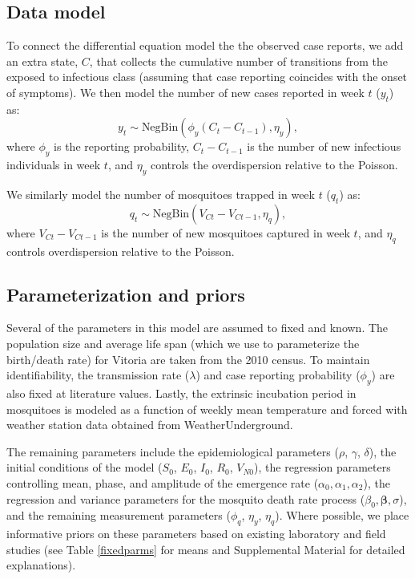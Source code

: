 \documentclass[10pt,letterpaper]{article}
\begin{document}
\subsection*{Data model}

To connect the differential equation model the the observed case reports, we add an extra state, $C$, that collects the cumulative number of transitions from the exposed to infectious class (assuming that case reporting coincides with the onset of symptoms).
We then model the number of new cases reported in week $t$ ($y_t$) as:
\begin{equation}
y_t  \sim \text{NegBin}(\phi_y (C_t - C_{t-1}), \eta_y),
\end{equation}
where $\phi_y$ is the reporting probability, $C_t - C_{t-1}$ is the number of new infectious individuals in week $t$, and $\eta_y$ controls the overdispersion relative to the Poisson.

We similarly model the number of mosquitoes trapped in week $t$ ($q_t$) as:
\begin{equation}
q_t \sim \text{NegBin}(V_{Ct} - V_{Ct-1}, \eta_q),
\end{equation}
where $V_{Ct} - V_{Ct-1}$ is the number of new mosquitoes captured in week $t$, and $\eta_q$ controls overdispersion relative to the Poisson.

\subsection*{Parameterization and priors}

Several of the parameters in this model are assumed to fixed and known. 
The population size and average life span (which we use to parameterize the birth/death rate) for Vitoria are taken from the 2010 census.
To maintain identifiability, the transmission rate ($\lambda$) and case reporting probability ($\phi_y$) are also fixed at literature values.
Lastly, the extrinsic incubation period in mosquitoes is modeled as a function of weekly mean temperature and forced with weather station data obtained from WeatherUnderground.

The remaining parameters include the epidemiological parameters ($\rho$, $\gamma$, $\delta$), the initial conditions of the model ($S_0$, $E_0$, $I_0$, $R_0$, $V_{N0}$), the regression parameters controlling mean, phase, and amplitude of the emergence rate ($\alpha_0,\alpha_1,\alpha_2$), the regression and variance parameters for the mosquito death rate process ($\beta_0,\mathbf{\beta},\sigma$), and the remaining measurement parameters ($\phi_q$, $\eta_y$, $\eta_q$).  
Where possible, we place informative priors on these parameters based on existing laboratory and field studies (see Table \ref{fixedparms} for means and Supplemental Material for detailed explanations).
\end{document}
